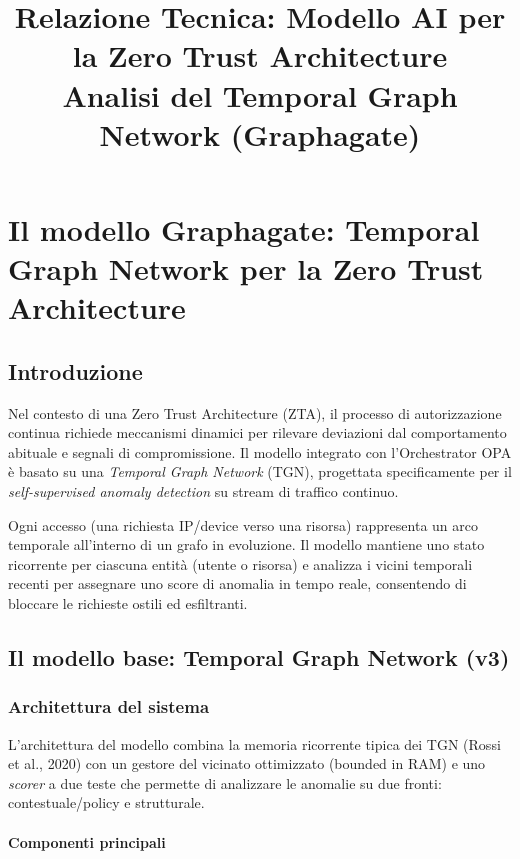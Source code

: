 \documentclass[11pt,a4paper]{report}
\title{\textbf{Relazione Tecnica: Modello AI per la Zero Trust Architecture}\\ \large Analisi del Temporal Graph Network (Graphagate)}
\author{}
\date{}
\begin{document}
\maketitle
\chapter{Il modello Graphagate: Temporal Graph Network per la Zero Trust Architecture}

\section{Introduzione}

Nel contesto di una Zero Trust Architecture (ZTA), il processo di autorizzazione continua richiede meccanismi dinamici per rilevare deviazioni dal comportamento abituale e segnali di compromissione. Il modello integrato con l'Orchestrator OPA è basato su una \textit{Temporal Graph Network} (TGN), progettata specificamente per il \textit{self-supervised anomaly detection} su stream di traffico continuo.

Ogni accesso (una richiesta IP/device verso una risorsa) rappresenta un arco temporale all'interno di un grafo in evoluzione. Il modello mantiene uno stato ricorrente per ciascuna entità (utente o risorsa) e analizza i vicini temporali recenti per assegnare uno score di anomalia in tempo reale, consentendo di bloccare le richieste ostili ed esfiltranti.

\section{Il modello base: Temporal Graph Network (v3)}
\label{sec:v3}

\subsection{Architettura del sistema}

L'architettura del modello combina la memoria ricorrente tipica dei TGN (Rossi et al., 2020) con un gestore del vicinato ottimizzato (bounded in RAM) e uno \textit{scorer} a due teste che permette di analizzare le anomalie su due fronti: contestuale/policy e strutturale.

\subsubsection{Componenti principali}
\end{document}
